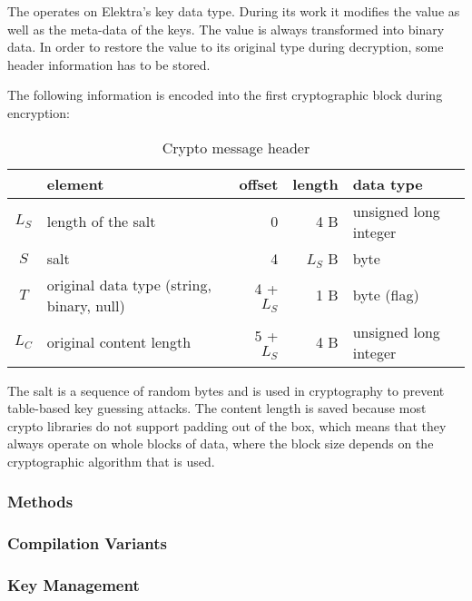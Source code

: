 The \crypto{} operates on Elektra's key data type. During its work it modifies
the value as well as the meta-data of the keys. The value is always
transformed into binary data. In order to restore the value to its original
type during decryption, some header information has to be stored.

The following information is encoded into the first cryptographic block during
encryption:

\begin{table}[h!]
\centering
\caption{Crypto message header}
\label{my-label}
\begin{tabular}{clrrl}
	\textbf{} & \textbf{element}                          & \textbf{offset} & \textbf{length} & \textbf{data type}    \\ \hline
	$L_S$     & length of the salt                        & 0               & 4 B             & unsigned long integer \\
	$S$       & salt                                      & 4               & $L_S$ B         & byte                  \\
	$T$       & original data type (string, binary, null) & 4 + $L_S$       & 1 B             & byte (flag)           \\
	$L_C$     & original content length                   & 5 + $L_S$       & 4 B             & unsigned long integer \\ \hline
\end{tabular}
\end{table}

The salt is a sequence of random bytes and is used in cryptography to prevent
table-based key guessing attacks.
The content length is saved because most crypto libraries do not support
padding out of the box, which means that they always operate on whole blocks
of data, where the block size depends on the cryptographic algorithm that is
used.

\subsubsection{Methods}


\subsubsection{Compilation Variants}


\subsubsection{Key Management}



